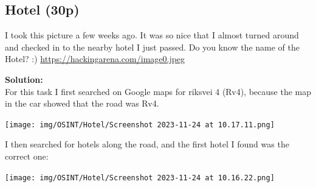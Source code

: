 \subsection{Hotel (30p)}
\addtocounter{points}{30}
I took this picture a few weeks ago. It was so nice that I almost turned around and checked in to the nearby hotel I just passed. Do you know the name of the Hotel? :)
\url{https://hackingarena.com/image0.jpeg}

\textbf{Solution:}\\
For this task I first searched on Google maps for riksvei 4 (Rv4), because the map in the car showed that the road was Rv4.

\begin{center}
    \texttt{[image: img/OSINT/Hotel/Screenshot 2023-11-24 at 10.17.11.png]}
\end{center}

I then searched for hotels along the road, and the first hotel I found was the correct one:

\begin{center}
    \texttt{[image: img/OSINT/Hotel/Screenshot 2023-11-24 at 10.16.22.png]}
\end{center}